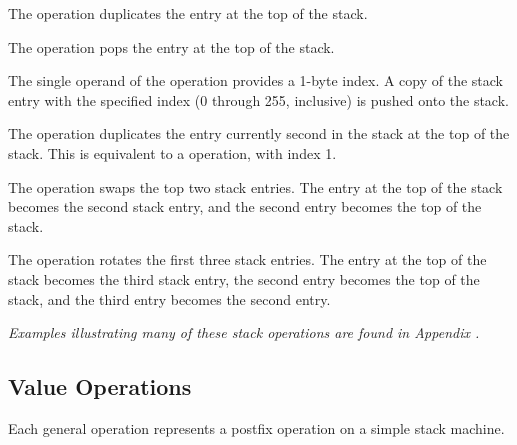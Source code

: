 \begin{enumerate}[1. ]
\itembfnl{\DWOPdupTARG}
The \DWOPdupNAME{} operation duplicates the entry at the top of the
stack.

\itembfnl{\DWOPdropTARG}
The \DWOPdropNAME{} operation pops the entry at the top of the stack.

\itembfnl{\DWOPpickTARG}
The single operand of the \DWOPpickNAME{} operation provides a 1-byte
index. A copy of the stack entry with the specified index (0 through
255, inclusive) is pushed onto the stack.

\itembfnl{\DWOPoverTARG}
The \DWOPoverNAME{} operation duplicates the entry currently second in
the stack at the top of the stack.  This is equivalent to a
\DWOPpick{} operation, with index 1.

\itembfnl{\DWOPswapTARG}
The \DWOPswapNAME{} operation swaps the top two stack entries.  The
entry at the top of the stack becomes the second stack entry, and the
second entry becomes the top of the stack.

\itembfnl{\DWOProtTARG}
The \DWOProtNAME{} operation rotates the first three stack
entries. The entry at the top of the stack becomes the third stack
entry, the second entry becomes the top of the stack, and the third
entry becomes the second entry.
\end{enumerate}

\textit{Examples illustrating many of these stack operations are
found in Appendix .}


\subsection{Value Operations}
\label{chap:valueoperations}
Each general operation represents a postfix operation on
a simple stack machine.

